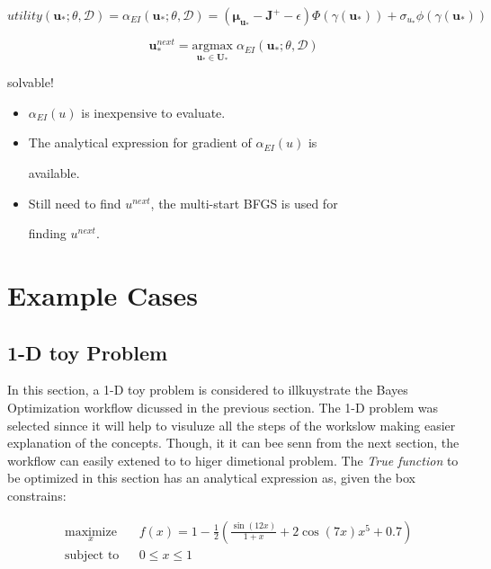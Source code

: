 \documentclass[]{elsarticle} %
\begin{document}
\begin{equation}
utility(\mathbf{u_*};\theta,\mathcal{D})=\alpha_{EI}(\mathbf{u_*};\theta,\mathcal{D})=(\mathbf{\mu_{u_\ast}}-\mathbf{J^+}-\epsilon)\Phi(\gamma(\mathbf{u
_*})) + \sigma_{u_{\ast}} \phi(\gamma(\mathbf{u_*}))
\label{eq:eq:utility_no_greed}
\end{equation}

\begin{equation}
\mathbf{u}_*^{next}=\underset{\mathbf{u_*} \in \mathbf{U_*} }{\mathrm{argmax}} \; \alpha_{EI}(\mathbf{u_*};\theta,\mathcal{D})
\label{eq:exp-easy}
\end{equation}

solvable!

\begin{itemize}
\item
  \(\alpha_{EI}(u)\) is inexpensive to evaluate.
\item
  The analytical expression for gradient of \(\alpha_{EI}(u)\) is

  available.
\item
  Still need to find \(u^{next}\), the multi-start BFGS is used for

  finding \(u^{next}\).
\end{itemize}

\newpage

\hypertarget{example-cases}{%
\section{Example Cases}\label{example-cases}}

\hypertarget{d-toy-problem}{%
\subsection{1-D toy Problem}\label{d-toy-problem}}

In this section, a 1-D toy problem is considered to illkuystrate the Bayes Optimization workflow dicussed in the previous section. The 1-D problem was selected sinnce it will help to visuluze all the steps of the workslow making easier explanation of the concepts. Though, it it can bee senn from the next section, the workflow can easily extened to to higer dimetional problem. The \emph{True function} to be optimized in this section has an analytical expression as, given the box constrains:

\begin{equation}
\begin{aligned}
& \underset{x}{\text{maximize}}
& & f(x) = 1-\frac{1}{2}(\frac{\sin (12x)}{1+x} + 2\cos(7x)x^5 + 0.7)  \\
& \text{subject to}
& & 0 \leq x \leq 1
\end{aligned}
\label{eq:1deq}
\end{equation}
\end{document}
